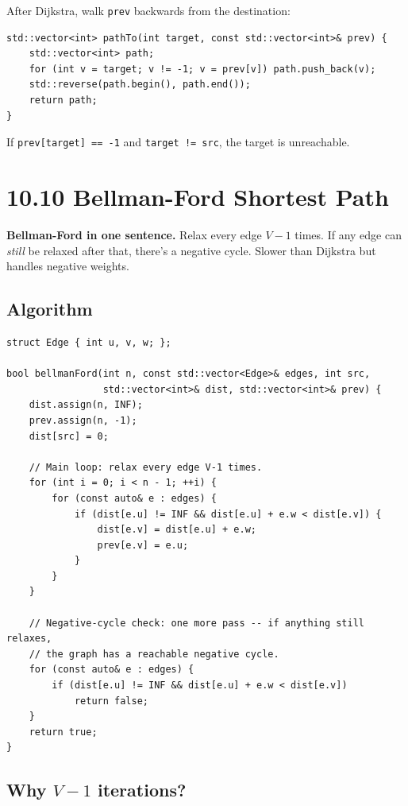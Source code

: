 \documentclass[11pt]{article}
\begin{document}
After Dijkstra, walk \texttt{prev} backwards from the destination:

\begin{lstlisting}[basicstyle=\ttfamily\small,frame=single]
std::vector<int> pathTo(int target, const std::vector<int>& prev) {
    std::vector<int> path;
    for (int v = target; v != -1; v = prev[v]) path.push_back(v);
    std::reverse(path.begin(), path.end());
    return path;
}
\end{lstlisting}

If \texttt{prev[target] == -1} and \texttt{target != src}, the target is unreachable.

\section{10.10 Bellman-Ford Shortest Path}

\begin{ideabox}
\textbf{Bellman-Ford in one sentence.} Relax every edge $V-1$ times. If any edge can \emph{still} be relaxed after that, there's a negative cycle. Slower than Dijkstra but handles negative weights.
\end{ideabox}

\subsection*{Algorithm}

\begin{lstlisting}[basicstyle=\ttfamily\small,frame=single]
struct Edge { int u, v, w; };

bool bellmanFord(int n, const std::vector<Edge>& edges, int src,
                 std::vector<int>& dist, std::vector<int>& prev) {
    dist.assign(n, INF);
    prev.assign(n, -1);
    dist[src] = 0;

    // Main loop: relax every edge V-1 times.
    for (int i = 0; i < n - 1; ++i) {
        for (const auto& e : edges) {
            if (dist[e.u] != INF && dist[e.u] + e.w < dist[e.v]) {
                dist[e.v] = dist[e.u] + e.w;
                prev[e.v] = e.u;
            }
        }
    }

    // Negative-cycle check: one more pass -- if anything still relaxes,
    // the graph has a reachable negative cycle.
    for (const auto& e : edges) {
        if (dist[e.u] != INF && dist[e.u] + e.w < dist[e.v])
            return false;
    }
    return true;
}
\end{lstlisting}

\subsection*{Why $V-1$ iterations?}
\end{document}
